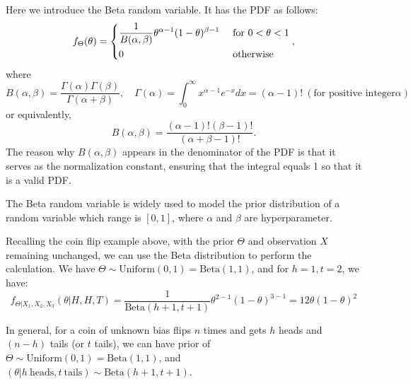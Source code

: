 Here we introduce the Beta random variable. It has the PDF as follows: 
\[
  f_{\Theta} (\theta) = \begin{dcases}
    \dfrac{1}{B(\alpha, \beta)} \theta^{\alpha-1} (1 - \theta)^{\beta - 1} &\text{ for } 0 < \theta < 1 \\
    0 &\text{ otherwise} 
  \end{dcases}, 
\]
where 
\[
  B(\alpha, \beta) = \dfrac{\Gamma(\alpha)\Gamma(\beta)}{\Gamma(\alpha + \beta)}, \quad \Gamma(\alpha) = \int_0^{\infty} x^{\alpha-1} e^{-x} dx = (\alpha - 1)!\ (\text{for positive integer} \alpha)
\]
or equivalently,
\[
  B(\alpha, \beta) = \dfrac{(\alpha - 1)!(\beta - 1)!}{(\alpha + \beta -1)!} .
\]
The reason why \(B(\alpha, \beta)\) appears in the denominator of the PDF is that it serves as the normalization constant, ensuring that the integral equals 1 so that it is a valid PDF.

The Beta random variable is widely used to model the prior distribution of a random variable which range is \([0, 1]\), where \(\alpha\) and \(\beta\) are hyperparameter. 

Recalling the coin flip example above, with the prior \(\Theta\) and observation \(X\) remaining unchanged, we can use the Beta distribution to perform the calculation. We have \(\Theta \sim \text{Uniform}(0, 1) = \text{Beta}(1, 1)\), and for \(h = 1, t = 2\), we have:
\[
  f_{\Theta \vert X_1, X_2, X_3} (\theta \vert H,H,T) = \dfrac{1}{\text{Beta}(h + 1, t + 1)} \theta^{2-1} (1 - \theta)^{3 - 1} = 12\theta (1 - \theta)^2
\]

In general, for a coin of unknown bias flips \(n\) times and gets \(h\) heads and \((n - h)\) tails (or \(t\) tails), we can have prior of \(\Theta \sim \text{Uniform}(0, 1) = \text{Beta}(1, 1)\), and \((\theta \vert h\ \text{heads}, t\ \text{tails}) \sim \text{Beta} (h + 1, t + 1)\). 

